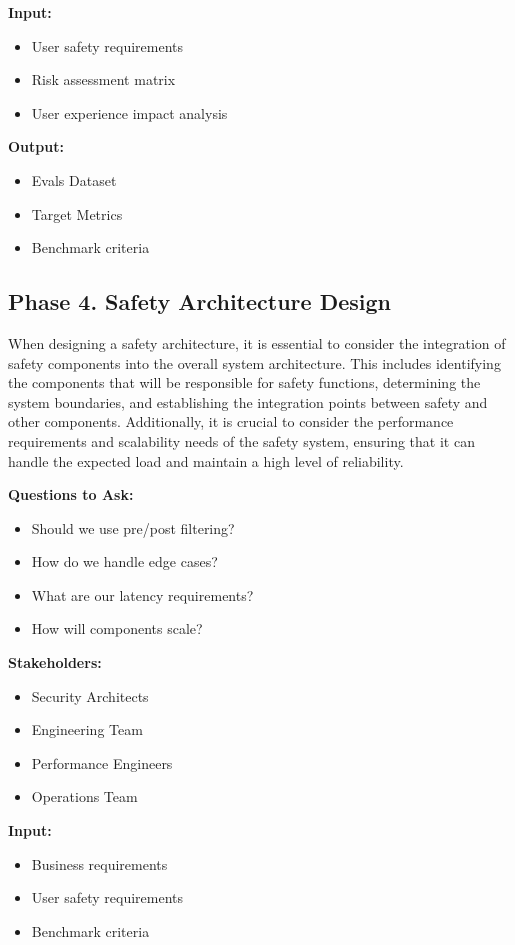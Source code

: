 \textbf{Input:}
\begin{itemize}
    \item User safety requirements
    \item Risk assessment matrix
    \item User experience impact analysis
\end{itemize}

\textbf{Output:}
\begin{itemize}
    \item Evals Dataset
    \item Target Metrics
    \item Benchmark criteria
\end{itemize}

\subsection{Phase 4. Safety Architecture Design}

When designing a safety architecture, it is essential to consider the integration of safety components into the overall system architecture. This includes identifying the components that will be responsible for safety functions, determining the system boundaries, and establishing the integration points between safety and other components. Additionally, it is crucial to consider the performance requirements and scalability needs of the safety system, ensuring that it can handle the expected load and maintain a high level of reliability.

\textbf{Questions to Ask:}
\begin{itemize}
    \item Should we use pre/post filtering?
    \item How do we handle edge cases?
    \item What are our latency requirements?
    \item How will components scale?
\end{itemize}

\textbf{Stakeholders:}
\begin{itemize}
    \item Security Architects
    \item Engineering Team
    \item Performance Engineers
    \item Operations Team
\end{itemize}

\textbf{Input:}
\begin{itemize}
    \item Business requirements
    \item User safety requirements
    \item Benchmark criteria
\end{itemize}

